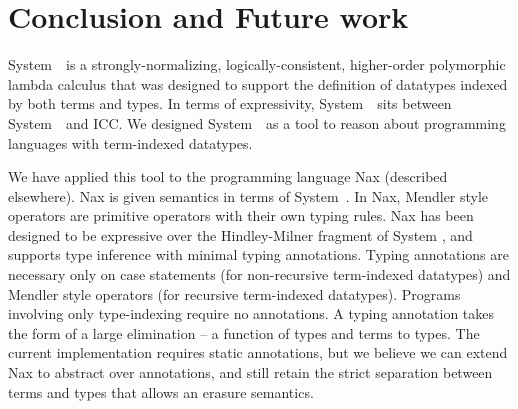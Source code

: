 \section{Conclusion and Future work}
\label{sec:concl}

System~\Fi\ is a strongly-normalizing, logically-consistent, higher-order
polymorphic lambda calculus that was designed to support the
definition of datatypes indexed by both terms and types.
In terms of expressivity, System~\Fi\ sits between System~\Fw\ and ICC.
We designed System~\Fi\ as a tool to reason about programming
languages with term-indexed datatypes. 

We have applied this tool to the programming language Nax (described elsewhere).
Nax is given semantics in terms of System~\Fi . In Nax, Mendler style operators
are primitive operators with their own typing rules. Nax has been designed to
be expressive over the Hindley-Milner fragment of System \Fi, and supports type
inference with minimal typing annotations. Typing annotations are necessary only
on case statements (for non-recursive term-indexed datatypes)
and Mendler style operators (for recursive term-indexed datatypes).
Programs involving only type-indexing require no annotations.
A typing annotation takes the form of a large elimination --
a function of types and terms to types. The current implementation requires
static annotations, but we believe we can extend Nax to abstract over
annotations, and still retain the strict separation between terms and types
that allows an erasure semantics.
 
